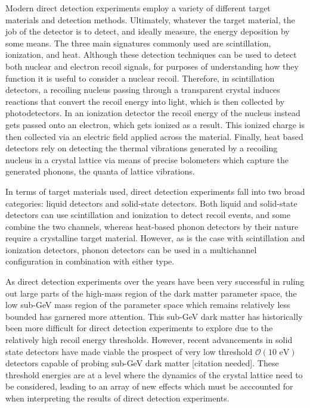 \documentclass[b5paper, 10pt, twoside]{book}
\newcommand{\typographersred}{scp-red-dark-3}
\newcommand{\needcite}{\textcolor{\typographersred}{[citation needed]}}
\begin{document}
Modern direct detection experiments employ a variety of different target materials and detection methods. Ultimately, whatever the target material, the job of the detector is to detect, and ideally measure, the energy deposition by some means. The three main signatures commonly used are scintillation, ionization, and heat. Although these detection techniques can be used to detect both nuclear and electron recoil signals, for purposes of understanding how they function it is useful to consider a nuclear recoil. Therefore, in scintillation detectors, a recoiling nucleus passing through a transparent crystal induces reactions that convert the recoil energy into light, which is then collected by photodetectors. In an ionization detector the recoil energy of the nucleus instead gets passed onto an electron, which gets ionized as a result. This ionized charge is then collected via an electric field applied across the material. Finally, heat based detectors rely on detecting the thermal vibrations generated by a recoiling nucleus in a crystal lattice via means of precise bolometers which capture the generated phonons, the quanta of lattice vibrations.

In terms of target materials used, direct detection experiments fall into two broad categories: liquid detectors and solid-state detectors. Both liquid and solid-state detectors can use scintillation and ionization to detect recoil events, and some combine the two channels, whereas heat-based phonon detectors by their nature require a crystalline target material. However, as is the case with scintillation and ionization detectors, phonon detectors can be used in a multichannel configuration in combination with either type.

As direct detection experiments over the years have been very successful in ruling out large parts of the high-mass region of the dark matter parameter space, the low sub-GeV mass region of the parameter space which remains relatively less bounded has garnered more attention. This sub-GeV dark matter has historically been more difficult for direct detection experiments to explore due to the relatively high recoil energy thresholds. However, recent advancements in solid state detectors have made viable the prospect of very low threshold $\mathcal{O}(\text{10 eV})$ detectors capable of probing sub-GeV dark matter \needcite. These threshold energies are at a level where the dynamics of the crystal lattice need to be considered, leading to an array of new effects which must be acccounted for when interpreting the results of direct detection experiments.
\end{document}
